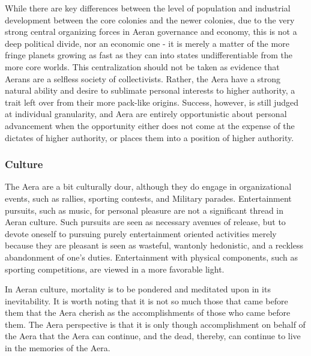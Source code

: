 While there are key differences between the level of population and
industrial development between the core colonies and the newer
colonies, due to the very strong central organizing forces in Aeran
governance and economy, this is not a deep political divide, nor an
economic one - it is merely a matter of the more fringe planets
growing as fast as they can into states undifferentiable from the more
core worlds. This centralization should not be taken as evidence that
Aerans are a selfless society of collectivists. Rather, the Aera have
a strong natural ability and desire to sublimate personal interests to
higher authority, a trait left over from their more pack-like
origins. Success, however, is still judged at individual granularity,
and Aera are entirely opportunistic about personal advancement when
the opportunity either does not come at the expense of the dictates of
higher authority, or places them into a position of higher authority.

\subsubsection{Culture}
The Aera are a bit culturally dour, although they do engage in
organizational events, such as rallies, sporting contests, and
Military parades. Entertainment pursuits, such as music, for personal
pleasure are not a significant thread in Aeran culture. Such pursuits
are seen as necessary avenues of release, but to devote oneself to
pursuing purely entertainment oriented activities merely because they
are pleasant is seen as wasteful, wantonly hedonistic, and a reckless
abandonment of one's duties. Entertainment with physical components,
such as sporting competitions, are viewed in a more favorable light.

In Aeran culture, mortality is to be pondered and meditated upon in
its inevitability. It is worth noting that it is not so much those
that came before them that the Aera cherish as the accomplishments of
those who came before them. The Aera perspective is that it is only
though accomplishment on behalf of the Aera that the Aera can
continue, and the dead, thereby, can continue to live in the memories
of the Aera.

